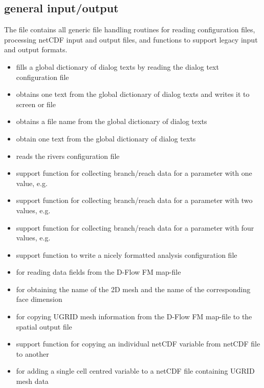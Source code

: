 \subsection{general input/output }

The  file contains all generic file handling routines for reading configuration files, processing netCDF input and output files, and functions to support legacy input and output formats.

\begin{itemize}
\item {} fills a global dictionary of dialog texts by reading the dialog text configuration file
\item {} obtains one text from the global dictionary of dialog texts and writes it to screen or file
\item {} obtains a file name from the global dictionary of dialog texts
\item {} obtain one text from the global dictionary of dialog texts

\item {} reads the rivers configuration file
\item {} support function for collecting branch/reach data for a parameter with one value, e.g. 
\item {} support function for collecting branch/reach data for a parameter with two values, e.g. 
\item {} support function for collecting branch/reach data for a parameter with four values, e.g. 
\item {} support function to write a nicely formatted analysis configuration file

\item {} for reading data fields from the D-Flow FM map-file
\item {} for obtaining the name of the 2D mesh and the name of the corresponding face dimension
\item {} for copying UGRID mesh information from the D-Flow FM map-file to the spatial output file
\item {} support function for copying an individual netCDF variable from netCDF file to another
\item {} for adding a single cell centred variable to a netCDF file containing UGRID mesh data


\end{itemize}
